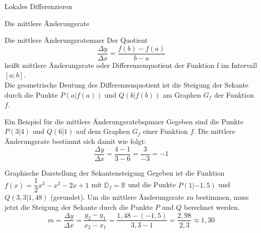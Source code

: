\begin{section}{Lokales Differenzieren}
\begin{subsection}{Die mittlere Änderungsrate}
\begin{defi}{Die mittlere Änderungsrate}{maer}
Der Quotient $$\dfrac{\Delta y}{\Delta x} = \dfrac{f(b) - f(a)}{b - a}$$ heißt mittlere Änderungsrate oder Differenzenquotient der Funktion f im Intervall $\left[a;b\right]$.\\
Die geometrische Deutung des Differenzenquotient  ist die Steigung der Sekante durch die Punkte $P(a|f(a))$ und $Q(b|f(b))$ am Graphen $G_f$ der Funktion $f$.
\end{defi}
\begin{bsp}{Ein Beispiel für die mittlere Änderungsrate}{bspmaer}
Gegeben sind die Punkte $P(3|4)$ und $Q(6|1)$ auf dem Graphen $G_f$ einer Funktion $f$. Die mittlere Änderungsrate bestimmt sich damit wie folgt: $$ \dfrac{\Delta y}{\Delta x} = \dfrac{4-1}{3-6} = \dfrac{3}{-3} = -1$$
\end{bsp}

\begin{bsp}{Graphische Darstellung der Sekantensteigung}{}
Gegeben ist die Funktion $f(x) =\dfrac{1}{2}x^3-x^2-2x +1$ mit $\mathds{D}_f =\mathds{R}$ und die Punkte $P(1|-1,5)$ und $Q(3,3|1,48)$ (gerundet). Um die mittlere Änderungsrate zu bestimmen, muss jetzt die Steigung der Sekante durch die Punkte $P$ und $Q$ berechnet werden.
$$m=\dfrac{\Delta y}{\Delta x} = \dfrac{y_2 -y_1}{x_2 -x_1} = \dfrac{1,48 -(-1,5)}{3,3 -1} = \dfrac{2,98}{2,3} \approx 1,30 $$
\begin{center}
\end{center}
\end{bsp}
\end{subsection}
\end{section}
